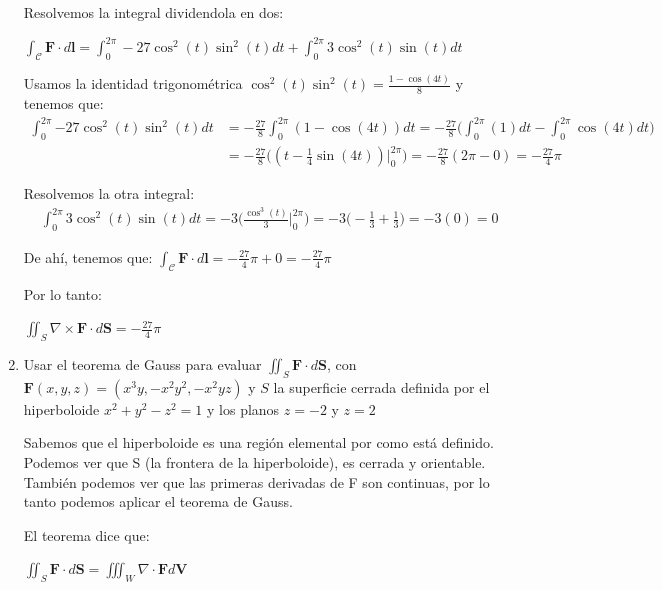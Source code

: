 \documentclass{article}
\begin{document}
\begin{enumerate}
{        Resolvemos la integral dividendola en dos:

         $\int_{\mathcal{C}} \mathbf{F} \cdot d\mathbf{l} = \int_{0}^{2\pi} -27\cos^2(t)\sin^2(t) dt +   \int_{0}^{2\pi}3\cos^2(t)\sin(t)dt$

         Usamos la identidad trigonométrica $\cos^2(t)\sin^2(t) = \frac{1 - \cos(4t)}{8}$ y tenemos que:
         \begin{align*}
                \int_{0}^{2\pi}{-27\cos^2(t)\sin^2(t)dt}
                &= -\frac{27}{8} \int_{0}^{2\pi}{(1 - \cos(4t)) dt}
                = -\frac{27}{8} \Big(\int_{0}^{2\pi}{(1)dt }  - \int_{0}^{2\pi}{\cos(4t)dt}\Big)\\[0.3cm]
                &= -\frac{27}{8}\Big((t - \frac{1}{4} \sin(4t))\Big |_{0}^{2\pi}\Big)
                = -\frac{27}{8} (2\pi - 0)
               	= -\frac{27}{4}\pi
            \end{align*}

		Resolvemos la otra integral:
		\begin{align*}
                &\int_{0}^{2\pi}{3\cos^2(t)\sin(t)dt}
                = -3\Big( \frac{\cos^3(t)}{3}\Big |_{0}^{2\pi}\Big)
                = -3 \Big(-\frac{1}{3} + \frac{1}{3}\Big)
               	= -3 (0)
               	= 0
            \end{align*}

		De ahí, tenemos que:
		$\int_{\mathcal{C}} \mathbf{F} \cdot d\mathbf{l} = -\frac{27}{4}\pi + 0 = -\frac{27}{4}\pi$

		Por lo tanto:

		$\iint_{S} \nabla \times \mathbf{F} \cdot d\mathbf{S} = -\frac{27}{4}\pi$

        }

        \item {
            Usar el teorema de Gauss para evaluar $\displaystyle\iint_{S} \mathbf{F} \cdot d\mathbf{S}$, con $\mathbf{F}(x,y,z) = (x^3y,-x^2y^2,-x^2yz)$ y $S$ la superficie cerrada definida por el hiperboloide $x^2 + y^2 - z^2 = 1$ y los planos $z = -2$ y $z = 2$

            \color{azul}
            Sabemos que el hiperboloide es una región elemental por como está definido. Podemos ver que S (la frontera de la hiperboloide), es cerrada y orientable. También podemos ver que las primeras derivadas de F son continuas, por lo tanto podemos aplicar el teorema de Gauss.

            El teorema dice que:

            $\iint_{S} \mathbf{F} \cdot d\mathbf{S} = \iiint_{W} \nabla \cdot \mathbf{F} d\mathbf{V}$

}
\end{enumerate}
\end{document}
